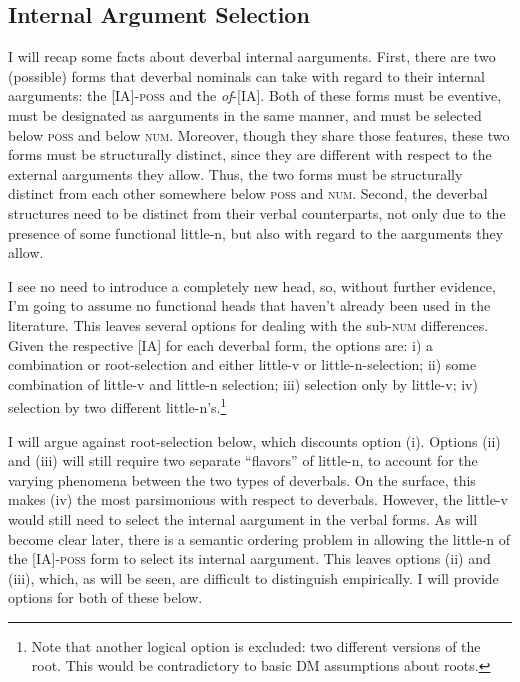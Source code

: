 \documentclass[12pt]{article}
\begin{document}
\subsection{Internal Argument Selection}\label{disc2}

I will recap some facts about deverbal internal aarguments. First, there are two (possible) forms that deverbal nominals can take with regard to their internal aarguments: the [IA]-\textsc{poss} and the \textit{of}-[IA]. Both of these forms must be eventive, must be designated as aarguments in the same manner, and must be selected below \textsc{poss} and below \textsc{num}. Moreover, though they share those features, these two forms must be structurally distinct, since they are different with respect to the external aarguments they allow. Thus, the two forms must be structurally distinct from each other somewhere below \textsc{poss} and \textsc{num}. Second, the deverbal structures need to be distinct from their verbal counterparts, not only due to the presence of some functional little-n, but also with regard to the aarguments they allow.

I see no need to introduce a completely new head, so, without further evidence, I'm going to assume no functional heads that haven't already been used in the literature. This leaves several options for dealing with the sub-\textsc{num} differences. Given the respective [IA] for each deverbal form, the options are: i) a combination or root-selection and either little-v or little-n-selection; ii) some combination of little-v and little-n selection; iii) selection only by little-v; iv) selection by two different little-n's.\footnote{ Note that another logical option is excluded: two different versions of the root. This would be contradictory to basic DM assumptions about roots.}

I will argue against root-selection below, which discounts option (i). Options (ii) and (iii) will still require two separate ``flavors'' of little-n, to account for the varying phenomena between the two types of deverbals. On the surface, this makes (iv) the most parsimonious with respect to deverbals. However, the little-v would still need to select the internal aargument in the verbal forms. As will become clear later, there is a semantic ordering problem in allowing the little-n of the [IA]-\textsc{poss} form to select its internal aargument. This leaves options (ii) and (iii), which, as will be seen, are difficult to distinguish empirically. I will provide options for both of these below.
\end{document}
